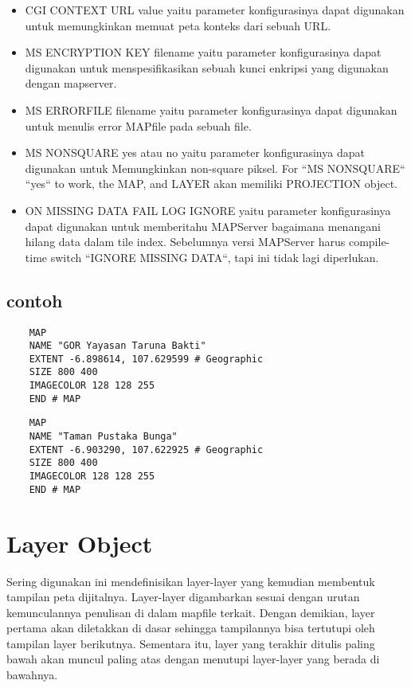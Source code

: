 \begin{itemize}
	\item CGI CONTEXT URL value yaitu parameter konfigurasinya dapat digunakan untuk memungkinkan memuat peta konteks dari sebuah URL.
	\item MS ENCRYPTION KEY filename yaitu parameter konfigurasinya dapat digunakan untuk menspesifikasikan sebuah kunci enkripsi yang digunakan dengan mapserver.
	\item MS ERRORFILE filename yaitu parameter konfigurasinya dapat digunakan untuk menulis error MAPfile pada sebuah file. 
	\item MS NONSQUARE yes atau no yaitu parameter konfigurasinya dapat digunakan untuk Memungkinkan non-square piksel. For ``MS NONSQUARE`` ``yes`` to work, the MAP, and LAYER akan memiliki PROJECTION object.
	\item ON MISSING DATA FAIL LOG IGNORE yaitu parameter konfigurasinya dapat digunakan untuk memberitahu MAPServer bagaimana menangani hilang data dalam tile index. Sebelumnya versi MAPServer harus compile-time switch ``IGNORE MISSING DATA``, tapi ini tidak lagi diperlukan.

\end{itemize}

\subsection{contoh}
	\begin{verbatim}
	MAP
  	NAME "GOR Yayasan Taruna Bakti"
  	EXTENT -6.898614, 107.629599 # Geographic
  	SIZE 800 400
  	IMAGECOLOR 128 128 255
	END # MAP
	\end{verbatim}

	\begin{verbatim}
	MAP
  	NAME "Taman Pustaka Bunga"
  	EXTENT -6.903290, 107.622925 # Geographic
  	SIZE 800 400
  	IMAGECOLOR 128 128 255
	END # MAP
	\end{verbatim}
\section{Layer Object}
Sering digunakan ini mendefinisikan layer-layer yang kemudian membentuk tampilan peta dijitalnya. Layer-layer digambarkan sesuai dengan urutan kemunculannya
penulisan di dalam mapfile terkait. Dengan demikian, layer pertama akan diletakkan di dasar sehingga tampilannya bisa tertutupi oleh tampilan layer 
berikutnya. Sementara itu, layer yang terakhir ditulis paling bawah akan muncul paling atas dengan menutupi layer-layer yang berada di bawahnya.


